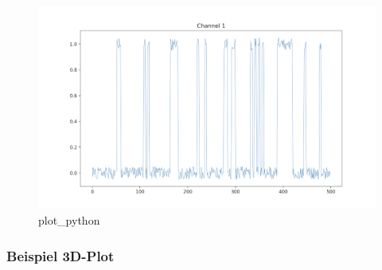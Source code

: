 \documentclass[11pt]{article}
\begin{document}
\begin{figure}
\centering
\includegraphics{images/plot_python.png}
\caption{plot\_python}
\end{figure}

\hypertarget{beispiel-3d-plot}{%
\subsubsection{Beispiel 3D-Plot}\label{beispiel-3d-plot}}
\end{document}
